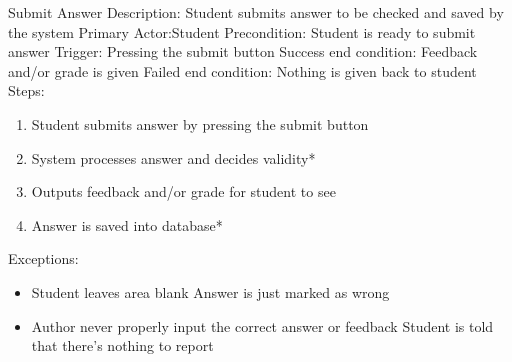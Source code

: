     
    \begin{section}{Submit Answer}
        Description: Student submits answer to be checked and saved by the system \newline
        Primary Actor:Student \newline
        Precondition: Student is ready to submit answer \newline
        Trigger: Pressing the submit button \newline
        Success end condition: Feedback and/or grade is given       \newline
        Failed end condition: Nothing is given back to student      \newline
        \newline
        Steps:
        \begin{enumerate}
            \item{Student submits answer by pressing the submit             button}
            \item{System processes answer and decides validity*}
            \item{Outputs feedback and/or grade for student to see}
            \item{Answer is saved into database*}
        \end{enumerate}
        Exceptions:
        \begin{itemize}
            \item{Student leaves area blank \newline
        	Answer is just marked as wrong}
            \item{Author never properly input the correct answer or     feedback \newline
        	Student is told that there's nothing to report}
        \end{itemize}
    \end{section}

